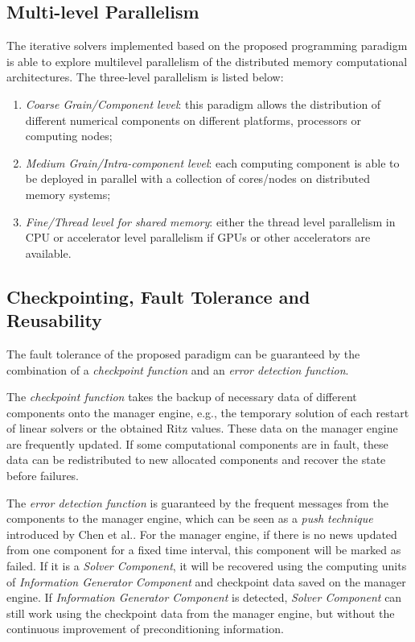 \subsection{Multi-level Parallelism}

The iterative solvers implemented based on the proposed programming paradigm is able to explore multilevel parallelism of the distributed memory computational architectures. The three-level parallelism is listed below:

\begin{enumerate}
	\item \textit{Coarse Grain/Component level}: this paradigm allows the distribution of different numerical components on different platforms, processors or computing nodes;
	\item \textit{Medium Grain/Intra-component level}: each computing component is able to be deployed in parallel with a collection of cores/nodes on distributed memory systems;
	\item \textit{Fine/Thread level for shared memory}:  either the thread level parallelism in CPU or accelerator level parallelism if GPUs or other accelerators are available. 
\end{enumerate} 

\subsection{Checkpointing, Fault Tolerance and Reusability}

The fault tolerance of the proposed paradigm can be guaranteed by the combination of a \textit{checkpoint function} and an \textit{error detection function}. 

The \textit{checkpoint function} takes the backup of necessary data of different components onto the manager engine, e.g., the temporary solution of each restart of linear solvers or the obtained Ritz values. These data on the manager engine are frequently updated. If some computational components are in fault, these data can be redistributed to new allocated components and recover the state before failures.

The \textit{error detection function} is guaranteed by the frequent messages from the components to the manager engine, which can be seen as a \textit{push technique} introduced by Chen et al.\cite{chen2002quality}. For the manager engine, if there is no news updated from one component for a fixed time interval, this component will be marked as failed. If it is a \textit{Solver Component}, it will be recovered using the computing units of \textit{Information Generator Component} and checkpoint data saved on the manager engine. If \textit{Information Generator Component} is detected, \textit{Solver Component}  can still work using the checkpoint data from the manager engine, but without the continuous improvement of preconditioning information.

